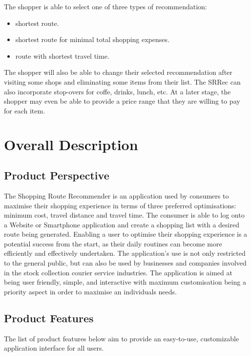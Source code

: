 \documentclass[10pt, a4paper, onecolumn]{scrartcl}
\begin{document}
			The shopper is able to select one of three types of recommendation:
			\begin{itemize}
				\item shortest route.
				\item shortest route for minimal total shopping expenses.
				\item route with shortest travel time.
			\end{itemize}
			
			The shopper will also be able to change their selected recommendation after visiting some shops and eliminating some items from their list. The SRRec can also incorporate stop-overs for coffe, drinks, lunch, etc. At a later stage, the shopper may even be able to provide a price range that they are willing to pay for each item.
		
	\section{Overall Description}
	
		\subsection{Product Perspective}
		
			The Shopping Route Recommender is an application used by consumers to maximise their shopping experience in terms of three preferred optimisations: minimum cost, travel distance and travel time. The consumer is able to log onto a Website or Smartphone application and create a shopping list with a desired route being generated.  Enabling a user to optimise their shopping experience is a potential success from the start, as their daily routines can become more efficiently and effectively undertaken. The application's use is not only restricted to the general public, but can also be used by businesses and companies involved in the stock collection courier service industries. The application is aimed at being user friendly, simple, and interactive with maximum customisation being a priority aspect in order to maximise an individuals needs. 
		
		\subsection{Product Features}
		
			The list of product features below aim to provide an easy-to-use, customizable application interface for all users. 
		
\end{document}
